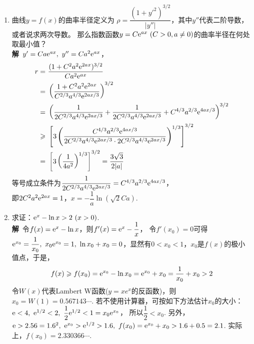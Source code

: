 \begin{enumerate}[label={【\textbf{例\thechapter.\arabic*}】},
 leftmargin=\inteval{\myenumleftmargin}pt,
 itemsep=\inteval{\myenumitempsep}pt,
 itemindent=\inteval{\myenumitemindent}pt]
\item 曲线$y=f(x)$的曲率半径定义为
$\rho=\dfrac{(1+y'^2)^{3/2}}{|y''|}$，其中$y''$代表二阶导数，
或者说求两次导数。
那么指数函数$y=C\e^{ax}\ (C>0, a\neq 0)$的曲率半径在何处取最小值？\\
\textbf{解}\ $y'=Ca\e^{ax},\ y''=Ca^2\e^{ax}$，
\begin{align*}
    r =&\ \dfrac{(1+C^2a^2\e^{2ax})^{3/2}}{Ca^2\e^{ax}}  \\
    =&\ \left(\dfrac{1+C^2a^2\e^{2ax}}{C^{2/3}a^{4/3}\e^{2ax/3}}\right)^{3/2} \\
    =&\ \left(\dfrac{1}{2C^{2/3}a^{4/3}\e^{2ax/3}}+
    \dfrac{1}{2C^{2/3}a^{4/3}\e^{2ax/3}}+
    C^{4/3}a^{2/3}\e^{4ax/3}\right)^{3/2} \\
    \geq&\ \left[3\left(\dfrac{C^{4/3}a^{2/3}\e^{4ax/3}}{
        2C^{2/3}a^{4/3}\e^{2ax/3}\cdot 2C^{2/3}a^{4/3}\e^{2ax/3}}
    \right)^{1/3}\right]^{3/2} \\
    =&\ \left[3\left(\dfrac{1}{4a^2}\right)^{1/3}\right]^{3/2}
    =\dfrac{3\sqrt{3}}{2|a|}
\end{align*}
等号成立条件为$ \dfrac{1}{2C^{2/3}a^{4/3}\mathrm{e}^{2ax/3}}=
C^{4/3}a^{2/3}\mathrm{e}^{4ax/3} $，\\ 
即$2C^2a^2\mathrm{e}^{2ax}=1$，$x=-\dfrac{1}{a}\ln(\sqrt{2}Ca)$. 

\item 求证：$ \e^x-\ln x>2\ (x>0) $. \\
\textbf{解}\ 令$ f(x)=\mathrm{e}^x-\ln x $，则$ f'(x)=\mathrm{e}^x-\dfrac{1}{x} $，
令$ f'(x_0)=0 $可得$ \e^{x_0}=\dfrac{1}{x_0},\ x_0\e^{x_0}=1,\ 
\ln x_0+x_0=0 $，显然有$ 0<x_0<1 $，$ x_0 $是$ f(x) $的极小值点，于是，
\begin{align*}
    f(x)\geqslant f(x_0)=\mathrm{e}^{x_0}-\ln x_0=\mathrm{e}^{x_0}+x_0=\dfrac{1}{x_0}+x_0>2
\end{align*}
令$ W(x) $代表Lambert W函数($ y=xe^x $的反函数)，则$ x_0=W(1)=0.567143\cdots $.
若不使用计算器，可按如下方法估计$ x_0 $的大小：
$ \e<4 ,\ \e^{1/2}< 2,\ \dfrac{1}{2}\e^{1/2} <1=x_0\e^{x_0} $，
所以$ \dfrac{1}{2}<x_0 $. 另外，
$ \e>2.56=1.6^2,\ \e^{x_0}>\e^{1/2}>1.6,\ f(x_0)=\e^{x_0}+x_0
>1.6+0.5=2.1 $. 实际上，$ f(x_0)=2.330366\cdots $. 


\end{enumerate}
